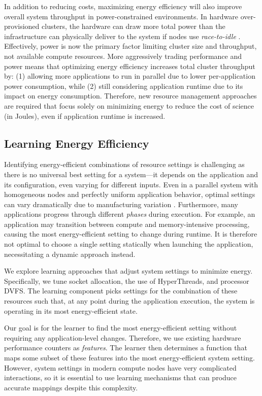 In addition to reducing costs, maximizing energy efficiency will also improve overall system throughput in power-constrained environments.
In hardware over-provisioned clusters, the hardware can draw more total power than the infrastructure can physically deliver to the system if nodes use \emph{race-to-idle} \cite{Sarood2013}.
Effectively, power is now the primary factor limiting cluster size and throughput, not available compute resources.
More aggressively trading performance and power means that optimizing energy efficiency increases total cluster throughput by: (1) allowing more applications to run in parallel due to lower per-application power consumption, while (2) still considering application runtime due to its impact on energy consumption.
Therefore, new resource management approaches are required that focus solely on minimizing energy to reduce the cost of science (in Joules), even if application runtime is increased.


\subsection{Learning Energy Efficiency}
\label{sec:challenges-learning}

Identifying energy-efficient combinations of resource settings is challenging as there is no universal best setting for a system---it depends on the application and its configuration, even varying for different inputs.
Even in a parallel system with homogeneous nodes and perfectly uniform application behavior, optimal settings can vary dramatically due to manufacturing variation \cite{Acun2016}.
Furthermore, many applications progress through different \emph{phases} during execution.
For example, an application may transition between compute and memory-intensive processing, causing the most energy-efficient setting to change during runtime.
It is therefore not optimal to choose a single setting statically when launching the application, necessitating a dynamic approach instead.

We explore learning approaches that adjust system settings to minimize energy.
Specifically, we tune socket allocation, the use of HyperThreads, and processor DVFS.
The learning component picks settings for the combination of these resources such that, at any point during the application execution, the system is operating in its most energy-efficient state.

Our goal is for the learner to find the most energy-efficient setting without requiring any application-level changes.
Therefore, we use existing hardware performance counters as \emph{features}.
The learner then determines a function that maps some subset of these features into the most energy-efficient system setting.
However, system settings in modern compute nodes have very complicated interactions, so it is essential to use learning mechanisms that can produce accurate mappings despite this complexity.

